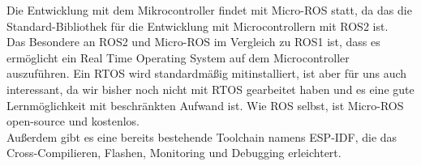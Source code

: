 \begin{flushleft}
    Die Entwicklung mit dem Mikrocontroller findet mit Micro-ROS statt, da das die Standard-Bibliothek für die Entwicklung mit Microcontrollern mit ROS2 ist.\\
    Das Besondere an ROS2 und Micro-ROS im Vergleich zu ROS1 ist, dass es ermöglicht ein Real Time Operating System auf dem Microcontroller auszuführen. Ein RTOS wird standardmäßig mitinstalliert, ist aber für uns auch interessant, da wir bisher noch nicht mit RTOS gearbeitet haben und es eine gute Lernmöglichkeit mit beschränkten Aufwand ist.
    Wie ROS selbst, ist Micro-ROS open-source und kostenlos.\cite{ros} \cite{micro_ros}\\
    Außerdem gibt es eine bereits bestehende Toolchain namens ESP-IDF, die das Cross-Compilieren, Flashen, Monitoring und Debugging erleichtert.
    \cite{esp_idf}

\end{flushleft}